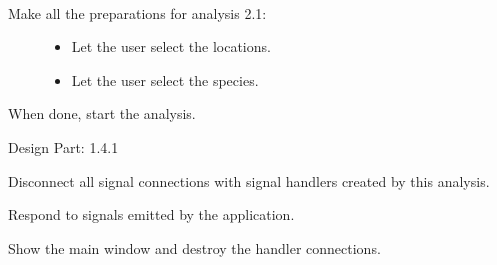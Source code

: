 \documentclass[letterpaper,10pt,english]{sphinxmanual}
\begin{document}
\begin{fulllineitems}
\label{setlyze/analysis/attraction_intra:setlyze.analysis.attraction_intra.Begin}~\begin{description}
\item[{Make all the preparations for analysis 2.1:}] \leavevmode\begin{itemize}
\item {} 
Let the user select the locations.

\item {} 
Let the user select the species.

\end{itemize}

\end{description}

When done, start the analysis.

Design Part: 1.4.1

\begin{fulllineitems}
\label{setlyze/analysis/attraction_intra:setlyze.analysis.attraction_intra.Begin.destroy_handler_connections}
Disconnect all signal connections with signal handlers created
by this analysis.

\end{fulllineitems}


\begin{fulllineitems}
\label{setlyze/analysis/attraction_intra:setlyze.analysis.attraction_intra.Begin.handle_application_signals}
Respond to signals emitted by the application.

\end{fulllineitems}


\begin{fulllineitems}
\label{setlyze/analysis/attraction_intra:setlyze.analysis.attraction_intra.Begin.on_analysis_closed}
Show the main window and destroy the handler connections.


\end{fulllineitems}
\end{fulllineitems}
\end{document}
